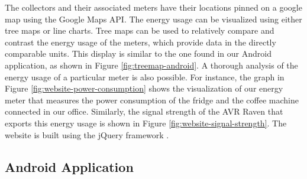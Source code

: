 \documentclass[10pt, conference, compsocconf, english]{IEEEtran}
\begin{document}
The collectors and their associated meters have their locations pinned
on a google map using the Google Maps API. The energy usage can be
visualized using either tree maps or line charts. Tree maps can be
used to relatively compare and contrast the energy usage of the meters,
which provide data in the directly comparable units. This display
is similar to the one found in our Android application, as shown in
Figure \ref{fig:treemap-android}. A thorough analysis of the energy
usage of a particular meter is also possible. For instance, the graph
in Figure \ref{fig:website-power-consumption} shows the visualization
of our energy meter that measures the power consumption of the fridge
and the coffee machine connected in our office. Similarly, the signal
strength of the AVR Raven that exports this energy usage is shown
in Figure \ref{fig:website-signal-strength}. The website is built
using the jQuery framework \cite{Bibeault:2008:JA:1407181}.


\subsection{Android Application}
\end{document}
